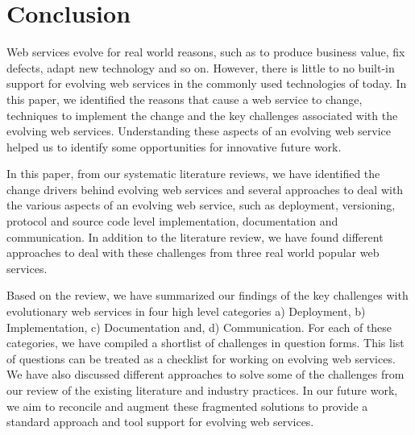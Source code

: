 \documentclass[runningheads,a4paper]{llncs}
\begin{document}
\section{Conclusion} %
\label{sec:conclusion}
Web services evolve for real world reasons, such as to produce business value, fix defects, adapt new technology and so on. However, there is little to no built-in support for evolving web services in the commonly used technologies of today. In this paper, we identified the reasons that cause a web service to change, techniques to implement the change and the key challenges associated with the evolving web services. Understanding these aspects of an evolving web service helped us to identify some opportunities for innovative future work.

In this paper, from our systematic literature reviews, we have identified the change drivers behind evolving web services and several approaches to deal with the various aspects of an evolving web service, such as deployment, versioning, protocol and source code level implementation, documentation and communication. In addition to the literature review, we have found different approaches to deal with these challenges from three real world popular web services.

Based on the review, we have summarized our findings of the key challenges with evolutionary web services in four high level categories a) Deployment, b) Implementation, c) Documentation and, d) Communication. For each of these categories, we have compiled a shortlist of challenges in question forms. This list of questions can be treated as a checklist for working on evolving web services. We have also discussed different approaches to solve some of the challenges from our review of the existing literature and industry practices. In our future work, we aim to reconcile and augment these fragmented solutions to provide a standard approach and tool support for evolving web services.



\end{document}
